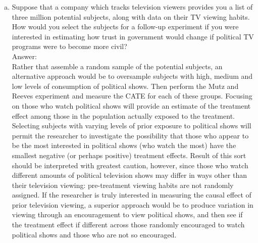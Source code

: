 \documentclass[11pt,notitlepage]{article}\usepackage[]{graphicx}\usepackage[]{color}
\begin{document}
\begin{enumerate}[a)]
\item Suppose that a company which tracks television viewers provides you a list of three million potential subjects, along with data on their TV viewing habits. How would you select the subjects for a follow-up experiment if you were interested in estimating how trust in government would change if political TV programs were to become more civil?\\
Answer:\\
Rather that assemble a random sample of the potential subjects, an alternative approach would be to oversample subjects with high, medium and low levels of consumption of political shows. Then perform the Mutz and Reeves experiment and measure the CATE for each of these groups. Focusing on those who watch political shows will provide an estimate of the treatment effect among those in the population actually exposed to the treatment. Selecting subjects with varying levels of prior exposure to political shows will permit the researcher to investigate the possibility that those who appear to be the most interested in political shows (who watch the most) have the smallest negative (or perhaps positive) treatment effects. Result of this sort should be interpreted with greatest caution, however, since those who watch different amounts of political television shows may differ in ways other than their television viewing: pre-treatment viewing habits are not randomly assigned.  If the researcher is truly interested in measuring the causal effect of prior television viewing, a superior approach would be to produce variation in viewing through an encouragement to view political shows, and then see if the treatment effect if different across those randomly encouraged to watch political shows and those who are not so encouraged.  


\end{enumerate}
\end{document}
